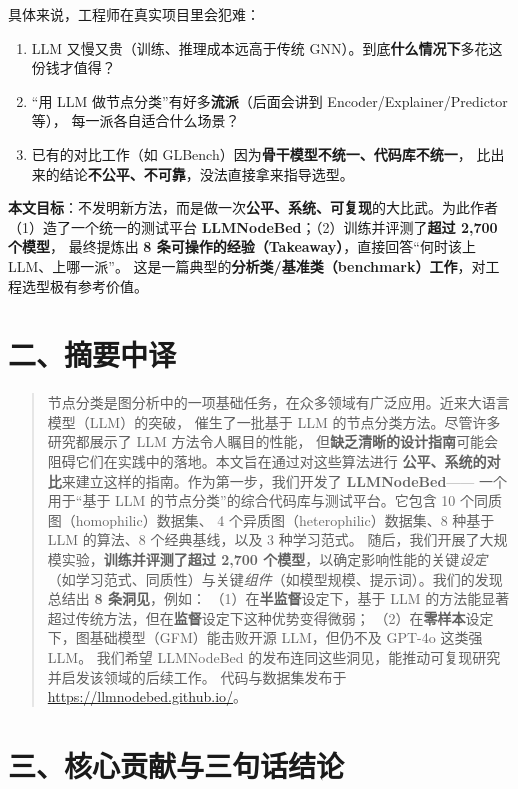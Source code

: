 \documentclass[11pt,UTF8,fontset=fandol]{ctexart}
\begin{document}
具体来说，工程师在真实项目里会犯难：
\begin{enumerate}[leftmargin=2em]
  \item LLM 又慢又贵（训练、推理成本远高于传统 GNN）。到底\textbf{什么情况下}多花这份钱才值得？
  \item “用 LLM 做节点分类”有好多\textbf{流派}（后面会讲到 Encoder/Explainer/Predictor 等），
        每一派各自适合什么场景？
  \item 已有的对比工作（如 GLBench）因为\textbf{骨干模型不统一、代码库不统一}，
        比出来的结论\textbf{不公平、不可靠}，没法直接拿来指导选型。
\end{enumerate}

\textbf{本文目标}：不发明新方法，而是做一次\textbf{公平、系统、可复现}的大比武。为此作者
（1）造了一个统一的测试平台 \textbf{LLMNodeBed}；（2）训练并评测了\textbf{超过 2{,}700 个模型}，
最终提炼出 \textbf{8 条可操作的经验（Takeaway）}，直接回答“何时该上 LLM、上哪一派”。
这是一篇典型的\textbf{分析类/基准类（benchmark）工作}，对工程选型极有参考价值。

\section{二、摘要中译}

\begin{quote}
节点分类是图分析中的一项基础任务，在众多领域有广泛应用。近来大语言模型（LLM）的突破，
催生了一批基于 LLM 的节点分类方法。尽管许多研究都展示了 LLM 方法令人瞩目的性能，
但\textbf{缺乏清晰的设计指南}可能会阻碍它们在实践中的落地。本文旨在通过对这些算法进行
\textbf{公平、系统的对比}来建立这样的指南。作为第一步，我们开发了 \textbf{LLMNodeBed}——
一个用于“基于 LLM 的节点分类”的综合代码库与测试平台。它包含 10 个同质图（homophilic）数据集、
4 个异质图（heterophilic）数据集、8 种基于 LLM 的算法、8 个经典基线，以及 3 种学习范式。
随后，我们开展了大规模实验，\textbf{训练并评测了超过 2{,}700 个模型}，以确定影响性能的关键\emph{设定}
（如学习范式、同质性）与关键\emph{组件}（如模型规模、提示词）。我们的发现总结出 \textbf{8 条洞见}，例如：
（1）在\textbf{半监督}设定下，基于 LLM 的方法能显著超过传统方法，但在\textbf{监督}设定下这种优势变得微弱；
（2）在\textbf{零样本}设定下，图基础模型（GFM）能击败开源 LLM，但仍不及 GPT-4o 这类强 LLM。
我们希望 LLMNodeBed 的发布连同这些洞见，能推动可复现研究并启发该领域的后续工作。
代码与数据集发布于 \url{https://llmnodebed.github.io/}。
\end{quote}

\section{三、核心贡献与三句话结论}
\end{document}
